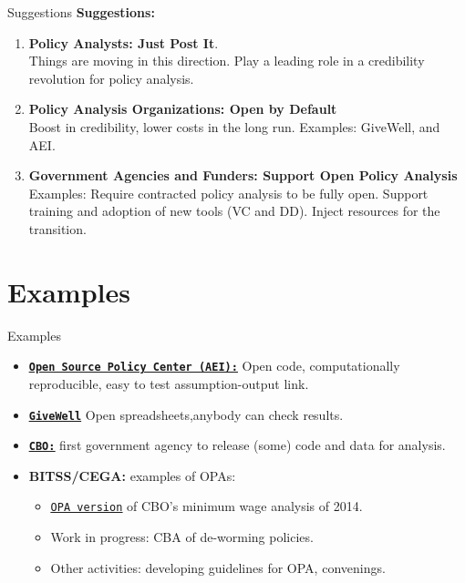 \documentclass{beamer}
\def\blue{\color{blue}}
\begin{document}
\begin{frame}{Suggestions}
\textbf{Suggestions:}
\begin{enumerate}
\item \textbf{Policy Analysts: Just Post It}. \\
Things are moving in this direction. Play a leading role in a credibility revolution for policy analysis.  
\item \textbf{Policy Analysis Organizations: Open by Default} \\
Boost in credibility, lower costs in the long run. Examples: GiveWell, and AEI. 
\item \textbf{Government Agencies and Funders: Support Open Policy Analysis}
Examples: Require contracted policy analysis to be fully open. Support training and adoption of new tools (VC and DD). Inject resources for the transition.
\end{enumerate}
\end{frame} 

\section{Examples}

\begin{frame}{Examples}

\begin{itemize}
\item \textbf{\texttt{\href{https://github.com/Open-source-economics}{{\blue\underline{Open Source Policy Center (AEI):}}}}}  Open code, computationally reproducible, easy to test assumption-output link.

\item \textbf{\texttt{\href{https://www.givewell.org/how-we-work/our-criteria/cost-effectiveness/cost-effectiveness-models}{{\blue\underline{GiveWell}}}}  } Open spreadsheets,anybody can check results. 

\item \textbf{\texttt{\href{https://www.cbo.gov/publication/54354}{{\blue\underline{CBO:}}}}  } first government agency to release (some) code and data for analysis.  

\item \textbf{BITSS/CEGA:} examples of OPAs:
\begin{itemize}
\item \texttt{\href{https://rpubs.com/fhoces/dd_cbo_mw}{{\blue\underline{OPA version}}}} of CBO's minimum wage analysis of 2014.
\item Work in progress: CBA of de-worming policies. 
\item Other activities: developing guidelines for OPA, convenings.  
\end{itemize} 
\end{itemize}
\end{frame}
\end{document}
